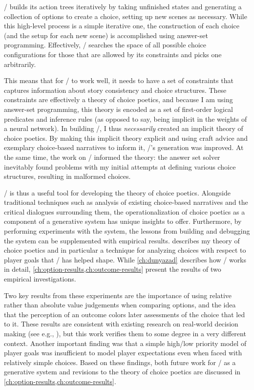 \dunyazad/ builds its action trees iteratively by taking unfinished states and generating a collection of options to create a choice, setting up new scenes as necessary.
%
While this high-level process is a simple iterative one, the construction of each choice (and the setup for each new scene) is accomplished using answer-set programming.
%
Effectively, \dunyazad/ searches the space of all possible choice configurations for those that are allowed by its constraints and picks one arbitrarily.


This means that for \dunyazad/ to work well, it needs to have a set of constraints that captures information about story consistency and choice structures.
%
These constraints are effectively a theory of choice poetics, and because I am using answer-set programming, this theory is encoded as a set of first-order logical predicates and inference rules (as opposed to say, being implicit in the weights of a neural network).
%
In building \dunyazad/, I thus \emph{necessarily} created an implicit theory of choice poetics.
%
By making this implicit theory explicit and using craft advice and exemplary choice-based narratives to inform it, \dunyazad/'s generation was improved.
%
At the same time, the work on \dunyazad/ informed the theory: the answer set solver inevitably found problems with my initial attempts at defining various choice structures, resulting in malformed choices.


\dunyazad/ is thus a useful tool for developing the theory of choice poetics.
%
Alongside traditional techniques such as analysis of existing choice-based narratives and the critical dialogues surrounding them, the operationalization of choice poetics as a component of a generative system has unique insights to offer.
%
Furthermore, by performing experiments with the system, the lessons from building and debugging the system can be supplemented with empirical results.
%
 describes my theory of choice poetics and in particular a technique for analyzing choices with respect to player goals that \dunyazad/ has helped shape.
%
While \cref{ch:dunyazad} describes how \dunyazad/ works in detail, \cref{ch:option-results,ch:outcome-results} present the results of two empirical investigations.


Two key results from these experiments are the importance of using relative rather than absolute value judgements when comparing options, and the idea that the perception of an outcome colors later assessments of the choice that led to it.
%
These results are consistent with existing research on real-world decision making (see e.g., \citep{Mellers1999,Shepperd2002}), but this work verifies them to some degree in a very different context.
%
Another important finding was that a simple high/low priority model of player goals was insufficient to model player expectations even when faced with relatively simple choices.
%
Based on these findings, both future work for \dunyazad/ as a generative system and revisions to the theory of choice poetics are discussed in \cref{ch:option-results,ch:outcome-results}.



